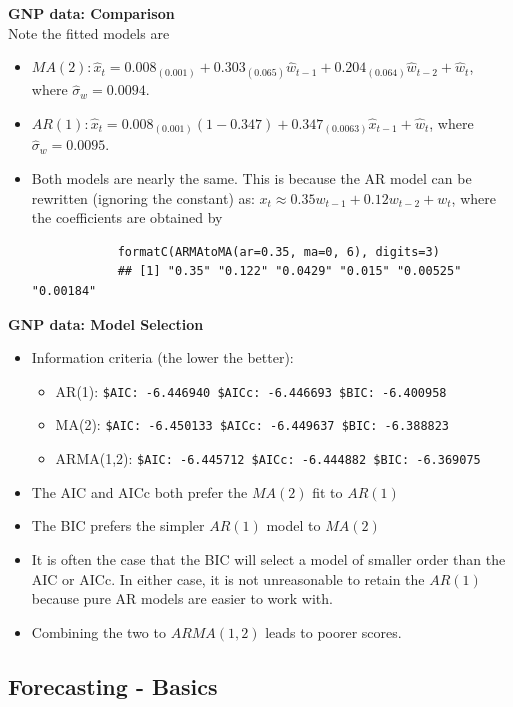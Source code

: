 \documentclass[11pt]{article}
\newcommand{\noi}{\noindent}
\begin{document}
\noi \textbf{GNP data: Comparison} \\
\noi Note the fitted models are
\begin{itemize}
    \item $MA(2): \hat{x}_t = 0.008_{(0.001)} + 0.303_{(0.065)}\hat{w}_{t-1} + 0.204_{(0.064)}\hat{w}_{t-2} + \hat{w}_t$, where $\hat{\sigma}_w = 0.0094$.
    \item $AR(1): \hat{x}_t = 0.008_{(0.001)}(1-0.347) + 0.347_{(0.0063)}\hat{x}_{t-1} + \hat{w}_t$, where $\hat{\sigma}_w = 0.0095$.
    \item Both models are nearly the same. This is because the AR model can be rewritten (ignoring the constant) as: $x_t \approx 0.35w_{t-1} + 0.12w_{t-2} + w_t$, where the coefficients are obtained by
        \begin{lstlisting}
            formatC(ARMAtoMA(ar=0.35, ma=0, 6), digits=3)
            ## [1] "0.35" "0.122" "0.0429" "0.015" "0.00525" "0.00184"
        \end{lstlisting}
\end{itemize} \phantom{i}

\noi \textbf{GNP data: Model Selection} \\
\begin{itemize}
    \item Information criteria (the lower the better):
        \begin{itemize}
            \item AR(1): \texttt{\$AIC: -6.446940 \$AICc: -6.446693 \$BIC: -6.400958}
            \item MA(2): \texttt{\$AIC: -6.450133 \$AICc: -6.449637 \$BIC: -6.388823}
            \item ARMA(1,2): \texttt{\$AIC: -6.445712 \$AICc: -6.444882 \$BIC: -6.369075}
        \end{itemize}
    \item The AIC and AICc both prefer the $MA(2)$ fit to $AR(1)$
    \item The BIC prefers the simpler $AR(1)$ model to $MA(2)$
    \item It is often the case that the BIC will select a model of smaller order than the AIC or AICc. In either case, it is not unreasonable to retain the $AR(1)$ because pure AR models are easier to work with.
    \item Combining the two to $ARMA(1,2)$ leads to poorer scores.
\end{itemize}

\subsection{Forecasting - Basics}
\end{document}
